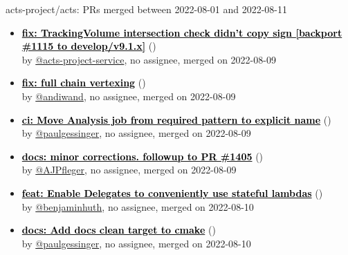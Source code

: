 \begin{frame}[allowframebreaks]{ acts-project/acts: PRs merged 
between 2022-08-01 and 2022-08-11
}
\begin{itemize}
    \item\prmerged\textbf{\href{https://github.com/acts-project/acts/pull/1383}{\textcolor{black}{fix: TrackingVolume intersection check didn't copy sign [backport \#1115 to develop/v9.1.x]}}}
    (\href{https://github.com/acts-project/acts/pull/1383}{}) \\
    by \href{https://github.com/acts-project-service}{@acts-project-service}, {}no assignee, merged on 2022-08-09

    \item\prmerged\textbf{\href{https://github.com/acts-project/acts/pull/1299}{\textcolor{black}{fix: full chain vertexing}}}
    (\href{https://github.com/acts-project/acts/pull/1299}{}) \\
    by \href{https://github.com/andiwand}{@andiwand}, {}no assignee, merged on 2022-08-09

    \item\prmerged\textbf{\href{https://github.com/acts-project/acts/pull/1411}{\textcolor{black}{ci: Move Analysis job from required pattern to explicit name}}}
    (\href{https://github.com/acts-project/acts/pull/1411}{}) \\
    by \href{https://github.com/paulgessinger}{@paulgessinger}, {}no assignee, merged on 2022-08-09

    \item\prmerged\textbf{\href{https://github.com/acts-project/acts/pull/1407}{\textcolor{black}{docs: minor corrections. followup to PR \#1405}}}
    (\href{https://github.com/acts-project/acts/pull/1407}{}) \\
    by \href{https://github.com/AJPfleger}{@AJPfleger}, {}no assignee, merged on 2022-08-09

    \item\prmerged\textbf{\href{https://github.com/acts-project/acts/pull/1410}{\textcolor{black}{feat: Enable Delegates to conveniently use stateful lambdas}}}
    (\href{https://github.com/acts-project/acts/pull/1410}{}) \\
    by \href{https://github.com/benjaminhuth}{@benjaminhuth}, {}no assignee, merged on 2022-08-10

    \item\prmerged\textbf{\href{https://github.com/acts-project/acts/pull/1393}{\textcolor{black}{docs: Add docs clean target to cmake}}}
    (\href{https://github.com/acts-project/acts/pull/1393}{}) \\
    by \href{https://github.com/paulgessinger}{@paulgessinger}, {}no assignee, merged on 2022-08-10


\end{itemize}
\end{frame}
